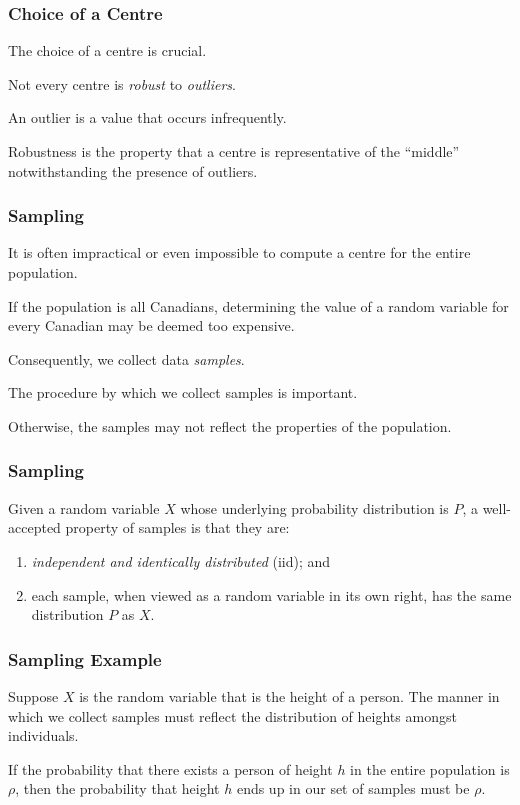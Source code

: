 \begin{frame}
\frametitle{Choice of a Centre}
\begin{changemargin}{1cm}

The choice of a centre is crucial. 

Not every centre is
\emph{robust} to \emph{outliers}. 

An outlier is a value
that occurs infrequently. 

Robustness is the property that
a centre is representative of the ``middle'' notwithstanding
the presence of outliers. 

\end{changemargin}
\end{frame}


\begin{frame}
\frametitle{Sampling}
\begin{changemargin}{1cm}
It is often impractical or even impossible to compute a
centre for the entire population. 

If the population
is all Canadians, determining the value of a random variable
for every Canadian may be deemed too expensive.

Consequently, we collect data \emph{samples}.

The procedure by which we collect samples is important.

Otherwise,
the samples may not reflect the properties of the population.

\end{changemargin}
\end{frame}


\begin{frame}
\frametitle{Sampling}
\begin{changemargin}{1cm}

Given a random variable $X$ whose underlying
probability distribution is $P$, a well-accepted property of
samples is that they are: 
\begin{enumerate}
\item \emph{independent and identically
distributed} (iid); and
\item each sample, when viewed as a
random variable
in its own right, has the same distribution $P$ as $X$.
\end{enumerate}

\end{changemargin}
\end{frame}


\begin{frame}
\frametitle{Sampling Example}
\begin{changemargin}{1cm}

Suppose $X$ is the random variable that is the height
of a person. 
The manner in which we collect samples must
reflect the distribution of heights amongst individuals.

If the probability that there exists a person of height $h$ in
the entire population is $\rho$, then the probability that height
$h$ ends up in our set of samples must be $\rho$.

\end{changemargin}
\end{frame}

